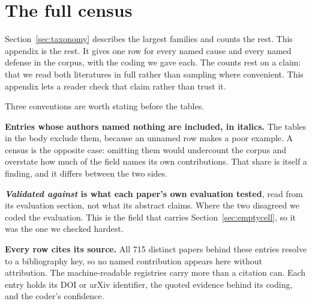 \clearpage
\onecolumn

\section{The full census} \label{sec:census}

Section~\ref{sec:taxonomy} describes the largest families and counts the rest.
This appendix is the rest. It gives one row for every named cause and
every named defense in the corpus, with the coding we gave each. The counts
rest on a claim: that we read both literatures in full rather than sampling
where convenient. This appendix lets a reader check that claim rather than
trust it.

Three conventions are worth stating before the tables.

\textbf{Entries whose authors named nothing are included, in italics.} The
tables in the body exclude them, because an unnamed row makes a poor example.
A census is the opposite case: omitting them would undercount the corpus and
overstate how much of the field names its own contributions. That share is
itself a finding, and it differs between the two sides.

\textbf{\emph{Validated against} is what each paper's own evaluation tested},
read from its evaluation section, not what its abstract claims. Where the two
disagreed we coded the evaluation. This is the field that carries
Section~\ref{sec:emptycell}, so it was the one we checked hardest.

\textbf{Every row cites its source.} All 715 distinct papers behind these
entries resolve to a bibliography key, so no named contribution appears here
without attribution. The machine-readable registries carry more than a
citation can. Each entry holds its DOI or arXiv identifier, the quoted
evidence behind its coding, and the coder's confidence.




